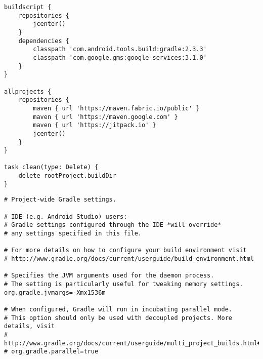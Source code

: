 \documentclass[12pt,a4paper]{article}
\begin{document}
\begin{lstlisting}[caption=./build.gradle]
buildscript {
    repositories {
        jcenter()
    }
    dependencies {
        classpath 'com.android.tools.build:gradle:2.3.3'
        classpath 'com.google.gms:google-services:3.1.0'
    }
}

allprojects {
    repositories {
        maven { url 'https://maven.fabric.io/public' }
        maven { url 'https://maven.google.com' }
        maven { url 'https://jitpack.io' }
        jcenter()
    }
}

task clean(type: Delete) {
    delete rootProject.buildDir
}
\end{lstlisting}
\pagebreak

\begin{lstlisting}[caption=./gradle.properties]
# Project-wide Gradle settings.

# IDE (e.g. Android Studio) users:
# Gradle settings configured through the IDE *will override*
# any settings specified in this file.

# For more details on how to configure your build environment visit
# http://www.gradle.org/docs/current/userguide/build_environment.html

# Specifies the JVM arguments used for the daemon process.
# The setting is particularly useful for tweaking memory settings.
org.gradle.jvmargs=-Xmx1536m

# When configured, Gradle will run in incubating parallel mode.
# This option should only be used with decoupled projects. More details, visit
# http://www.gradle.org/docs/current/userguide/multi_project_builds.html#sec:decoupled_projects
# org.gradle.parallel=true
\end{lstlisting}
\pagebreak
\end{document}

